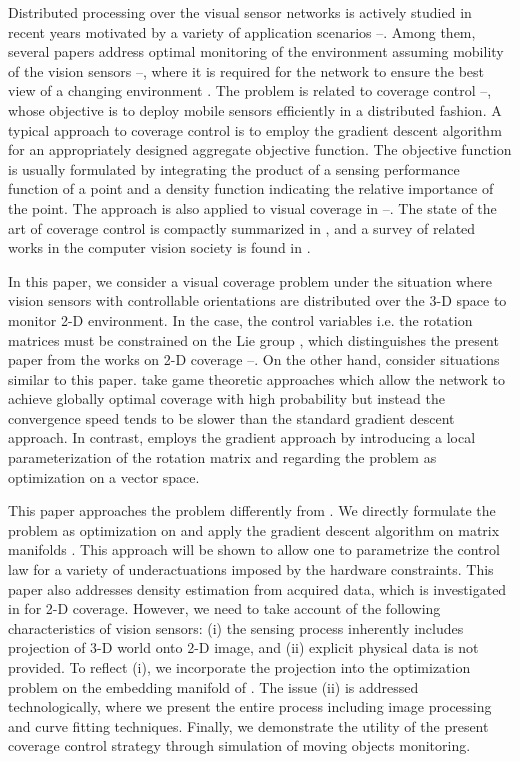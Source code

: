 \documentclass[conference,letterpaper]{ieeeconf}
\begin{document}
Distributed processing over the visual sensor networks 
is actively studied in recent years motivated by a variety of
application scenarios \cite{amit2}--\cite{HWF_CDC13}.
Among them, several papers address optimal monitoring of the environment
assuming mobility of the vision sensors
\cite{EYE}--\cite{HWF_CDC13},
where it is required for the network to ensure
the best view of a changing environment \cite{EYE}.
The problem is related to coverage control \cite{CL_EJC05}--\cite{BCM_ES05},
whose objective is to deploy mobile sensors efficiently
in a distributed fashion.
A typical approach to coverage control is to employ
the gradient descent algorithm
for an appropriately designed aggregate objective function.
The objective function is usually formulated by
integrating the product 
of a sensing performance function of a point
and a density function indicating the 
relative importance of the point.
The approach is also applied to visual coverage 
in \cite{EYE}--\cite{GTF_CDC08}.
The state of the art of coverage control is compactly summarized in \cite{EYE},
and a survey of related works in the computer vision society is found in \cite{survey}.



In this paper, we consider a visual coverage problem 
under the situation where vision sensors with controllable 
orientations are distributed over the 3-D space
to monitor 2-D environment.
In the case, the control variables i.e. the rotation matrices
must be constrained on the Lie group ,
which distinguishes the present paper from the works
on 2-D coverage \cite{cortes}--\cite{ZM_SIAM13}.
On the other hand, \cite{EYE,DSMFC_SP12,HWF_CDC13} consider
situations similar to this paper.
\cite{DSMFC_SP12,HWF_CDC13} take game theoretic approaches
which allow the network to achieve globally optimal coverage with
high probability but instead the convergence speed tends
to be slower than the standard gradient descent approach.
In contrast, \cite{EYE} employs the gradient approach
by introducing a local parameterization of
the rotation matrix and regarding the problem as optimization on a vector space.



This paper approaches the problem differently from \cite{EYE}.
We directly formulate the problem as optimization on 
and apply the gradient descent algorithm on matrix manifolds \cite{AMS_BK}.
This approach will be shown to allow one to parametrize the 
control law for a variety of underactuations imposed by the hardware constraints.
This paper also addresses density estimation from acquired data,
which is investigated in \cite{IJRR} for 2-D coverage.
However, we need to take account of the following 
characteristics of vision sensors:
(i) the sensing process inherently includes
projection of 3-D world onto 2-D image, and
(ii) explicit physical data is not provided.
To reflect (i), we incorporate the projection into the 
optimization problem on the embedding manifold of .
The issue (ii) is addressed technologically, where 
we present the entire process including image processing 
and curve fitting techniques.
Finally, we demonstrate the utility of the present coverage 
control strategy through simulation of moving objects monitoring.
\end{document}
